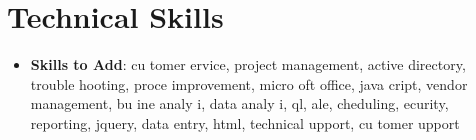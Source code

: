 \documentclass[letterpaper,11pt]{article}
\begin{document}
\section{Technical Skills}

\begin{itemize}[leftmargin=0.15in]
\item \textbf{Skills to Add}{: cu tomer  ervice, project management, active directory, trouble hooting, proce  improvement, micro oft office, java cript, vendor management, bu ine  analy i, data analy i, ql, ale, cheduling, ecurity, reporting, jquery, data entry, html, technical  upport, cu tomer  upport}
\end{itemize}
\end{document}
